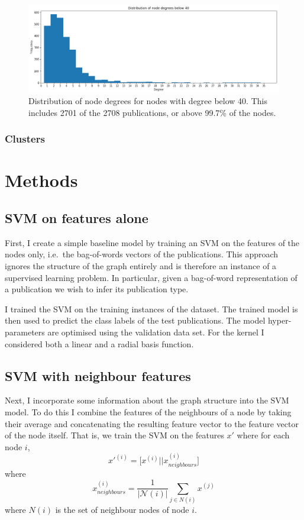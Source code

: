 \documentclass[12pt]{article}
\theoremstyle{definition}
\begin{document}
\begin{figure}[h]
	\includegraphics[width=1.0\textwidth]{node_degrees_truncated}
	\centering
	\caption{Distribution of node degrees for nodes with degree below 40. This includes 2701 of the 2708 publications, or above 99.7\% of the nodes.}
	\label{fig/node_degrees_truncated}
\end{figure}

\subsubsection{Clusters}

\section{Methods}
\subsection{SVM on features alone}
First, I create a simple baseline model by training an SVM on the features of the nodes only, i.e.\ the bag-of-words vectors of the publications. This approach ignores the structure of the graph entirely and is therefore an instance of a supervised learning problem. In particular, given a bag-of-word representation of a publication we wish to infer its publication type. 

I trained the SVM on the training instances of the dataset. The trained model is then used to predict the class labels of the test publications. The model hyper-parameters are optimised using the validation data set. For the kernel I considered both a linear and a radial basis function.

\subsection{SVM with neighbour features}
\label{section/SVM_neighbour_features}
Next, I incorporate some information about the graph structure into the SVM model. To do this I combine the features of the neighbours of a node by taking their average and concatenating the resulting feature vector to the feature vector of the node itself. That is, we train the SVM on the features $x'$ where for each node $i$,
\[
	x'^{(i)} = \big[x^{(i)} || x_{neighbours}^{(i)} \big]
\]
where
\[
	x_{neighbours}^{(i)} = \frac{1}{\left\vert \mathcal{N}(i) \right\vert} \sum_{j \in N(i)} x^{(j)}
\]
where $N(i)$ is the set of neighbour nodes of node $i$.
\end{document}
